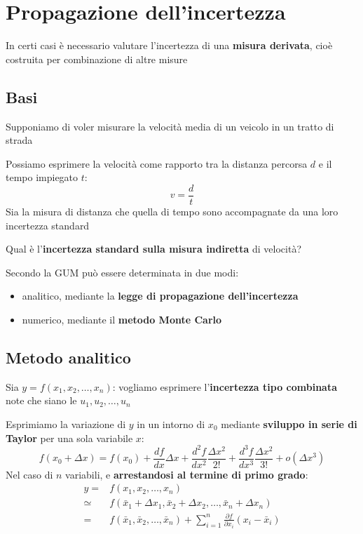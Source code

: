 \documentclass[
  letterpaper,
  DIV=11,
  numbers=noendperiod,
  oneside]{scrartcl}
\providecommand{\tightlist}{%
  \setlength{\itemsep}{0pt}\setlength{\parskip}{0pt}}
\begin{document}
\section{Propagazione
dell'incertezza}\label{propagazione-dellincertezza}

In certi casi è necessario valutare l'incertezza di una \textbf{misura
derivata}, cioè costruita per combinazione di altre misure

\subsection{Basi}\label{basi}

Supponiamo di voler misurare la velocità media di un veicolo in un
tratto di strada

Possiamo esprimere la velocità come rapporto tra la distanza percorsa
\(d\) e il tempo impiegato \(t\): \[
v=\frac{d}{t}
\] Sia la misura di distanza che quella di tempo sono accompagnate da
una loro incertezza standard

Qual è l'\textbf{incertezza standard sulla misura indiretta} di
velocità?

Secondo la GUM può essere determinata in due modi:

\begin{itemize}
\tightlist
\item
  analitico, mediante la \textbf{legge di propagazione dell'incertezza}
\item
  numerico, mediante il \textbf{metodo Monte Carlo}
\end{itemize}

\subsection{Metodo analitico}\label{metodo-analitico}

Sia \(y=f(x_1,x_2,\dots,x_n)\): vogliamo esprimere l'\textbf{incertezza
tipo combinata} note che siano le \(u_1,u_2,\dots,u_n\)

Esprimiamo la variazione di \(y\) in un intorno di \(x_0\) mediante
\textbf{sviluppo in serie di Taylor} per una sola variabile \(x\): \[
f(x_0+\Delta x)=f(x_0)+\frac{df}{dx}\Delta x + \frac{d^2f}{dx^2}\frac{\Delta x^2}{2!} + \frac{d^3f}{dx^3}\frac{\Delta x^2}{3!}+o(\Delta x^3)
\] Nel caso di \(n\) variabili, e \textbf{arrestandosi al termine di
primo grado}:
\begin{align}
y =&f(x_1,x_2,\dots,x_n) \\
\simeq&f\left( \bar x_1 + \Delta x_1, \bar x_2 + \Delta x_2, \dots, \bar x_n + \Delta x_n  \right) \\
=& f(\bar x_1, \bar x_2,\dots,\bar x_n) + \sum_{i=1}^n \frac{\partial f}{\partial x_i}(x_i-\bar x_i)
\end{align}
\end{document}

